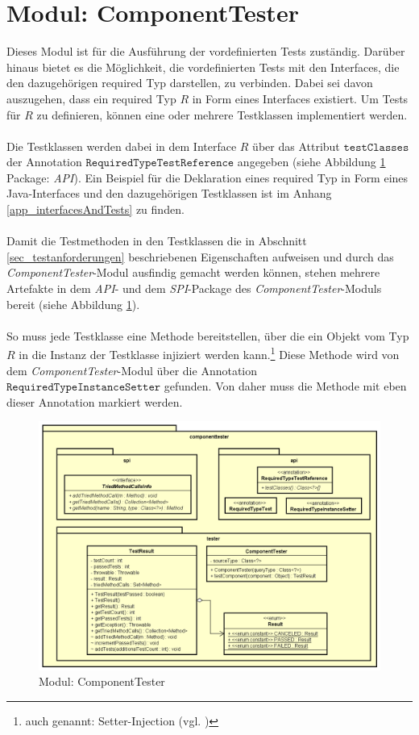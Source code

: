 \section{Modul: ComponentTester}\label{sec_Impl_CT}
Dieses Modul ist für die Ausführung der vordefinierten Tests zuständig. Darüber hinaus bietet es die Möglichkeit, die vordefinierten Tests mit den \Gls{Interface}s, die den dazugehörigen required Typ darstellen, zu verbinden. Dabei sei davon auszugehen, dass ein required Typ $R$ in Form eines \Gls{Interface}s existiert. Um Tests für $R$ zu definieren, können eine oder mehrere Testklassen implementiert werden.
\\\\
Die Testklassen werden dabei in dem \Gls{Interface} $R$ über das Attribut $\texttt{testClasses}$ der Annotation $\texttt{RequiredTypeTestReference}$ angegeben (siehe Abbildung \ref{fig_cdCompTester} Package: \emph{API}). Ein Beispiel für die Deklaration eines required Typ in Form eines Java-Interfaces und den dazugehörigen Testklassen ist im Anhang \ref{app_interfacesAndTests} zu finden.
\\\\
Damit die Testmethoden in den Testklassen die in Abschnitt \ref{sec_testanforderungen} beschriebenen Eigenschaften aufweisen und durch das \emph{ComponentTester}-Modul ausfindig gemacht werden können, stehen mehrere Artefakte in dem \emph{API}- und dem \emph{SPI}-Package des \emph{ComponentTester}-Moduls bereit (siehe Abbildung \ref{fig_cdCompTester}).
\\\\
So muss jede Testklasse eine Methode bereitstellen, über die ein Objekt vom Typ $R$ in die Instanz der Testklasse injiziert werden kann.\footnote{auch genannt: Setter-Injection (vgl. \cite{setterinjection})} Diese Methode wird von dem \emph{ComponentTester}-Modul über die Annotation $\texttt{RequiredTypeInstanceSetter}$ gefunden. Von daher muss die Methode mit eben dieser Annotation markiert werden.
\begin{figure}[h!]
\centering
\includegraphics[scale=0.6]{pics/cd_ComponentTester.png}
\caption{Modul: ComponentTester}
\label{fig_cdCompTester}
\end{figure}
